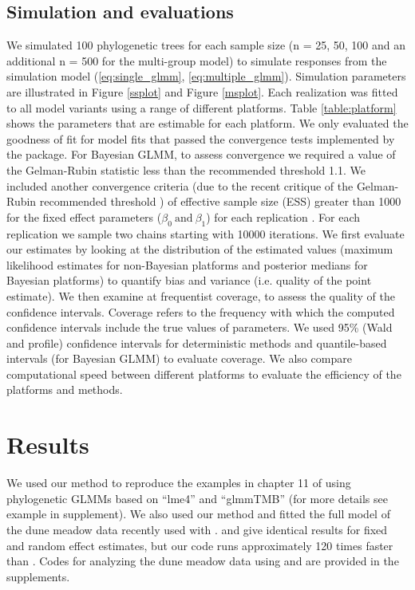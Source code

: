 \documentclass[12pt]{article}
\begin{document}
\subsection*{Simulation and evaluations}
We simulated 100 phylogenetic trees for each sample size (n = 25, 50, 100 and an additional n = 500 for the multi-group model) to simulate responses from the simulation model (\ref{eq:single_glmm}, \ref{eq:multiple_glmm}). Simulation parameters are illustrated in Figure \ref{ssplot} and Figure \ref{msplot}.
Each realization was fitted to all model variants using a range of different platforms.
Table \ref{table:platform} shows the parameters that are estimable for each platform. 
We only evaluated the goodness of fit for model fits that passed the convergence tests implemented by the package.
For Bayesian GLMM, to assess convergence we required a value of the Gelman-Rubin statistic less than the recommended threshold 1.1. We included another convergence criteria (due to the recent critique of the Gelman-Rubin recommended threshold \citep{vats2018revisiting}) of effective sample size (ESS) greater than 1000 for the fixed effect parameters ($\beta_{0} \ \textrm{and} \ \beta_{1}$) for each replication \citep{vehtari2019rank}. 
For each replication we sample two chains starting with 10000 iterations. 
We first evaluate our estimates by looking at the distribution of the estimated values (maximum likelihood estimates for non-Bayesian platforms and posterior medians for Bayesian platforms) to quantify bias and variance (i.e. quality of the point estimate).
We then examine at frequentist coverage, to assess the quality of the confidence intervals.
Coverage refers to the frequency with which the computed confidence intervals include the true values of parameters.
We used 95\% (Wald and profile) confidence intervals for deterministic methods and quantile-based intervals (for Bayesian GLMM) to evaluate coverage.
We also compare computational speed between different platforms to evaluate the efficiency of the platforms and methods. 


\section*{Results}

We used our method to reproduce the examples in chapter 11 of \cite{garamszegi2014modern} using phylogenetic GLMMs based on ``lme4'' and ``glmmTMB'' (for more details see example in supplement).
We also used our method and fitted the full model of the dune meadow data recently used with  \citep{li2017canfun}. 
 and  give identical results for fixed and random effect estimates, but our code runs approximately 120 times faster than . 
Codes for analyzing the dune meadow data using  and  are provided in the supplements. 
\end{document}
